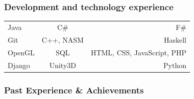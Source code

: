 \documentclass{article}
\begin{document}
	\subsubsection{Development and technology experience}
	
	\begin{tabular}{| l | c | r |}
		Java   & C\#     & F\#                          \\
		Git    & C++, NASM     & Haskell                     \\
		OpenGL & SQL     & HTML, CSS, JavaScript, PHP   \\
		Django & Unity3D & Python                     
	\end{tabular}

	\subsubsection{Past Experience \& Achievements}
\end{document}
